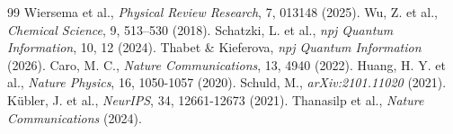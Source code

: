 \documentclass[aps,prxquantum,twocolumn,superscriptaddress]{revtex4-2}
\begin{document}
\begin{thebibliography}{99}
 Wiersema et al., \textit{Physical Review Research}, 7, 013148 (2025).
 Wu, Z. et al., \textit{Chemical Science}, 9, 513–530 (2018).
 Schatzki, L. et al., \textit{npj Quantum Information}, 10, 12 (2024).
 Thabet \& Kieferova, \textit{npj Quantum Information} (2026).
 Caro, M. C., \textit{Nature Communications}, 13, 4940 (2022).
 Huang, H. Y. et al., \textit{Nature Physics}, 16, 1050-1057 (2020).
 Schuld, M., \textit{arXiv:2101.11020} (2021).
 Kübler, J. et al., \textit{NeurIPS}, 34, 12661-12673 (2021).
 Thanasilp et al., \textit{Nature Communications} (2024).
\end{thebibliography}
\end{document}
